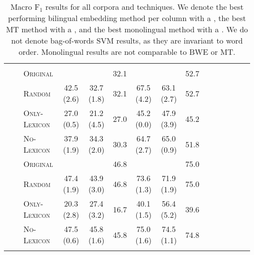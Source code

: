\documentclass[a4paper,11pt,twocolumn,twoside]{article}
\newcommand{\original}{\textsc{Original}\xspace}
\newcommand{\random}{\textsc{Random}\xspace}
\newcommand{\onlylex}{\textsc{Only-Lexicon}\xspace}
\newcommand{\nolex}{\textsc{No-Lexicon}\xspace}
\newcommand{\rt}[1]{\rotatebox{90}{#1}}
\newcommand{\F}{$\text{F}_1$\xspace}
\begin{document}
\begin{table*}[th!]
\begin{tabular}{lllcccccccccccc}
\\[3pt]
\hline \\

\multirow{13}{*}{\rt{Monolingual}}
    & \multirow{4}{*}{\rt{ES}}
  		& \original  & \bestmono{43.2 \scriptsize{(3.3)}} & \bestmono{36.2 \scriptsize{(2.2)}} & 32.1  & \bestmono{68.5 \scriptsize{(3.4)}} & \bestmono{64.8 \scriptsize{(2.3)}} & 52.7 \\
		&& \random 	 & 42.5 \scriptsize{(2.6)} & 32.7 \scriptsize{(1.8)} & 32.1  & 67.5 \scriptsize{(4.2)} & 63.1 \scriptsize{(2.7)} & 52.7 \\ 
		&& \onlylex  & 27.0 \scriptsize{(0.5)} & 21.2 \scriptsize{(4.5)} & 27.0  & 45.2 \scriptsize{(0.0)} & 47.9 \scriptsize{(3.9)} & 45.2 \\ 
		&& \nolex 	 & 37.9 \scriptsize{(1.9)} & 34.3 \scriptsize{(2.0)} & 30.3  & 64.7 \scriptsize{(2.7)} & 65.0 \scriptsize{(0.9)} & 51.8 \\ 
		\sepp
	& \multirow{4}{*}{\rt{CA}}
  		& \original  & \bestmono{48.6 \scriptsize{(1.6)}} & \bestmono{46.2 \scriptsize{(0.8)}}  & 46.8  & \bestmono{77.1 \scriptsize{(1.3)}} & \bestmono{76.4 \scriptsize{(1.2)}} & 75.0  \\
		&& \random   & 47.4 \scriptsize{(1.9)} & 43.9 \scriptsize{(3.0)}  & 46.8  & 73.6 \scriptsize{(1.3)} & 71.9 \scriptsize{(1.9)} & 75.0  \\ 
		&& \onlylex  & 20.3 \scriptsize{(2.8)} & 27.4 \scriptsize{(3.2)}  & 16.7  & 40.1 \scriptsize{(1.5)} & 56.4 \scriptsize{(5.2)} & 39.6  \\ 
		&& \nolex    & 47.5 \scriptsize{(0.6)} & 45.8 \scriptsize{(1.6)}  & 45.8  & 75.0 \scriptsize{(1.6)} & 74.5 \scriptsize{(1.1)} & 74.8  \\ 
		
\\

\bottomrule
\end{tabular}
\caption{Macro \F results for all corpora and techniques. We denote
  the best performing bilingual embedding
  method per column with a , the best MT method with a , and the best monolingual method
  with a . We do not denote bag-of-words SVM results, as they are invariant to word order. Monolingual results are not comparable to BWE or MT.}
\label{results:all}
\end{table*}
\end{document}
